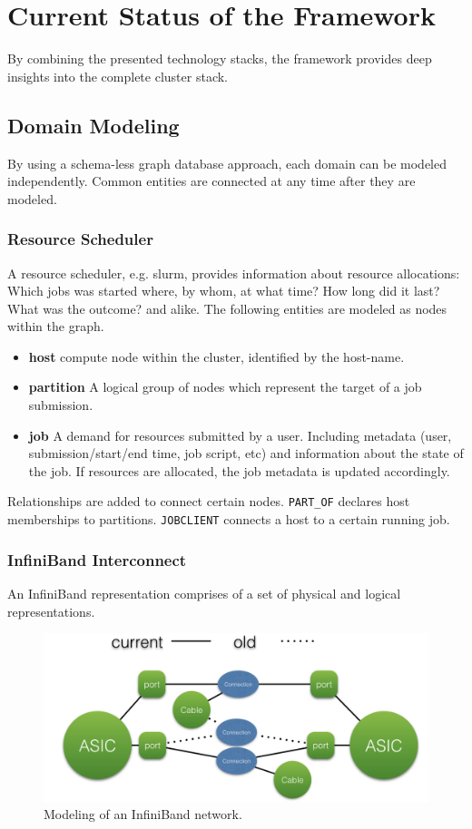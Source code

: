 \section{Current Status of the Framework}
By combining the presented technology stacks, the framework provides deep insights into the complete cluster stack.

\subsection{Domain Modeling}
By using a schema-less graph database approach, each domain can be modeled independently. Common entities are connected at any time after
they are modeled.

\subsubsection{Resource Scheduler}
A resource scheduler, e.g. \gls{slurm}, provides information about resource allocations: Which jobs was started where, by whom,  at what time? How long did it last? What was the outcome? and alike.
The following entities are modeled as nodes within the graph.
\begin{itemize}
    \item \textbf{host} compute node within the cluster, identified by the host-name.
    \item \textbf{partition} A logical group of nodes which represent the target of a job submission.
    \item \textbf{job} A demand for resources submitted by a user. Including metadata (user, submission/start/end time, job script, etc) and information about the state of the job. If resources are allocated, the job metadata is updated accordingly.
\end{itemize}
Relationships are added to connect certain nodes. \lstinline{PART_OF} declares host memberships to partitions. \lstinline{JOBCLIENT} connects a host to a certain running job.

\subsubsection{InfiniBand Interconnect}
An InfiniBand representation comprises of a set of physical and logical representations.
\begin{figure}[!ht]
    \includegraphics[width=.4\textwidth]{images/png/infiniband_graph.png}
    \caption{\label{fig:ib_graph}Modeling of an InfiniBand network.}
\end{figure}

